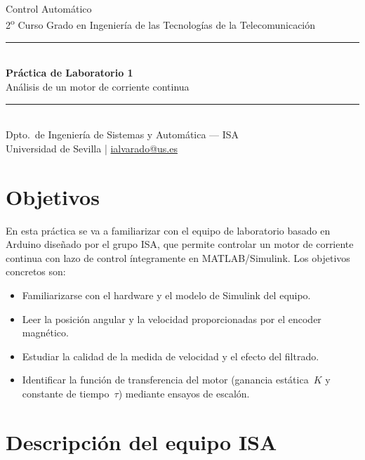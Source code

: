 \documentclass[12pt,a4paper]{article}
\begin{document}

\begin{center}
  {\large Control Automático}\\[2pt]
  {\large 2\textsuperscript{o} Curso Grado en Ingeniería de las Tecnologías de la Telecomunicación}\\[10pt]
  \rule{\linewidth}{1.5pt}\\[6pt]
  {\LARGE\bfseries\color{isablue} Práctica de Laboratorio 1}\\[4pt]
  {\Large Análisis de un motor de corriente continua}\\[4pt]
  \rule{\linewidth}{1.5pt}\\[6pt]
  {\small Dpto.\ de Ingeniería de Sistemas y Automática — ISA\\
   Universidad de Sevilla \quad | \quad \url{ialvarado@us.es}}
\end{center}

\vspace{6pt}

\section{Objetivos}

En esta práctica se va a familiarizar con el equipo de laboratorio basado en Arduino
diseñado por el grupo ISA, que permite controlar un motor de corriente continua
con lazo de control íntegramente en MATLAB/Simulink.
Los objetivos concretos son:

\begin{itemize}[noitemsep]
  \item Familiarizarse con el hardware y el modelo de Simulink del equipo.
  \item Leer la posición angular y la velocidad proporcionadas por el encoder magnético.
  \item Estudiar la calidad de la medida de velocidad y el efecto del filtrado.
  \item Identificar la función de transferencia del motor (ganancia estática~$K$ y
        constante de tiempo~$\tau$) mediante ensayos de escalón.
\end{itemize}

\section{Descripción del equipo ISA}
\end{document}
